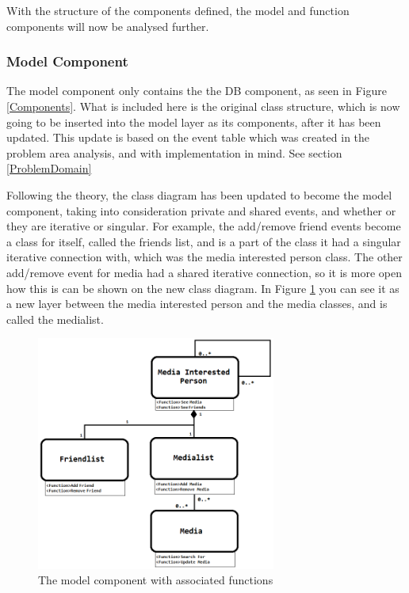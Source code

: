 With the structure of the components defined, the model and function components will now be analysed further.

\subsubsection{Model Component}
\label{ModelComponentSec}

The model component only contains the the DB component, as seen in Figure \ref{Components}. What is included here is the original class structure, which is now going to be inserted into the model layer as its components, after it has been updated. This update is based on the event table which was created in the problem area analysis, and with implementation in mind. See section \ref{ProblemDomain}

Following the theory, the class diagram has been updated to become the model component, taking into consideration private and shared events, and whether or they are iterative or singular. For example, the add/remove friend events become a class for itself, called the friends list, and is a part of the class it had a singular iterative connection with, which was the media interested person class. The other add/remove event for media had a shared iterative connection, so it is more open how this is can be shown on the new class diagram. In Figure \ref{ModelComponent} you can see it as a new layer between the media interested person and the media classes, and is called the medialist.

\begin{figure}[htb]
\centering
\includegraphics[width=0.7\textwidth]{Images/modelcomponent.png}
\caption{The model component with associated functions}
\label{ModelComponent}
\end{figure}

